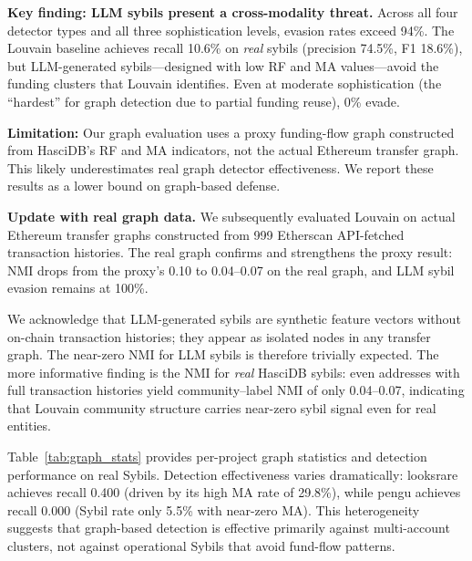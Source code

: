 \documentclass[sigconf,nonacm=false]{acmart}
\begin{document}
\textbf{Key finding: LLM sybils present a cross-modality threat.} Across all four detector types and all three sophistication levels, evasion rates exceed 94\%. The Louvain baseline achieves recall 10.6\% on \textit{real} sybils (precision 74.5\%, F1 18.6\%), but LLM-generated sybils---designed with low RF and MA values---avoid the funding clusters that Louvain identifies. Even at moderate sophistication (the ``hardest'' for graph detection due to partial funding reuse), \evasionGraphModerate{}0\% evade.

\textbf{Limitation:} Our graph evaluation uses a proxy funding-flow graph constructed from HasciDB's RF and MA indicators, not the actual Ethereum transfer graph. This likely underestimates real graph detector effectiveness. We report these results as a lower bound on graph-based defense.

\label{sec:real-graph}
\textbf{Update with real graph data.}
We subsequently evaluated Louvain on actual Ethereum transfer graphs constructed from 999 Etherscan API-fetched transaction histories. The real graph confirms and strengthens the proxy result: NMI drops from the proxy's 0.10 to 0.04--0.07 on the real graph, and LLM sybil evasion remains at 100\%.

We acknowledge that LLM-generated sybils are synthetic feature vectors without on-chain transaction histories; they appear as isolated nodes in any transfer graph. The near-zero NMI for LLM sybils is therefore trivially expected. The more informative finding is the NMI for \emph{real} HasciDB sybils: even addresses with full transaction histories yield community--label NMI of only 0.04--0.07, indicating that Louvain community structure carries near-zero sybil signal even for real entities.

Table~\ref{tab:graph_stats} provides per-project graph statistics and detection performance on real Sybils. Detection effectiveness varies dramatically: looksrare achieves recall 0.400 (driven by its high MA rate of 29.8\%), while pengu achieves recall 0.000 (Sybil rate only 5.5\% with near-zero MA). This heterogeneity suggests that graph-based detection is effective primarily against multi-account clusters, not against operational Sybils that avoid fund-flow patterns.
\end{document}
